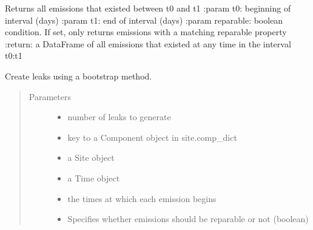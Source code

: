 \documentclass[letterpaper,10pt,english]{sphinxmanual}
\begin{document}
\begin{fulllineitems}
\begin{fulllineitems}
\label{\detokenize{index:feast.EmissionSimModules.emission_class_functions.Emission.get_emissions_in_range}}
Returns all emissions that existed between t0 and t1
:param t0: beginning of interval (days)
:param t1: end of interval (days)
:param reparable: boolean condition. If set, only returns emissions with a matching reparable property
:return: a DataFrame of all emissions that existed at any time in the interval t0:t1

\end{fulllineitems}


\end{fulllineitems}


\begin{fulllineitems}
\label{\detokenize{index:feast.EmissionSimModules.emission_class_functions.bootstrap_emission_maker}}
Create leaks using a bootstrap method.
\begin{quote}\begin{description}
\item[{Parameters}] \leavevmode\begin{itemize}
\item {} 
 \textendash{} number of leaks to generate

\item {} 
 \textendash{} key to a Component object in site.comp\_dict

\item {} 
 \textendash{} a Site object

\item {} 
 \textendash{} a Time object

\item {} 
 \textendash{} the times at which each emission begins

\item {} 
 \textendash{} Specifies whether emissions should be reparable or not (boolean)

\end{itemize}

\end{description}\end{quote}

\end{fulllineitems}
\end{document}

